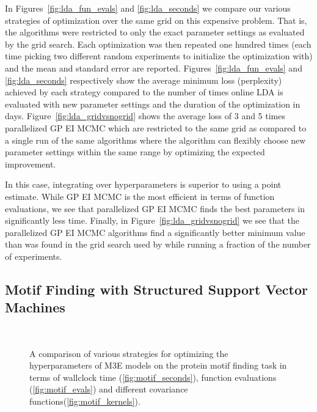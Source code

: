 \documentclass[aos,preprint]{imsart}
\begin{document}
In Figures~\ref{fig:lda_fun_evals} and \ref{fig:lda_seconds} we
compare our various strategies of optimization over the same grid on
this expensive problem. That is, the algorithms were restricted to
only the exact parameter settings as evaluated by the grid search.
Each optimization was then repeated one hundred times (each time
picking two different random experiments to initialize the
optimization with) and the mean and standard error are
reported. Figures~\ref{fig:lda_fun_evals} and \ref{fig:lda_seconds}
respectively show the average minimum loss (perplexity) achieved by
each strategy compared to the number of times online LDA is evaluated
with new parameter settings and the duration of the optimization in
days.  Figure~\ref{fig:lda_gridvsnogrid} shows the average loss of 3
and 5 times parallelized GP EI MCMC which are restricted to the same
grid as compared to a single run of the same algorithms where the
algorithm can flexibly choose new parameter settings within the same
range by optimizing the expected improvement.

In this case, integrating over hyperparameters is superior to using a point
estimate.  While GP EI MCMC is the most efficient in
terms of function evaluations, we see that parallelized GP EI MCMC
finds the best parameters in significantly less time.  Finally, in
Figure~\ref{fig:lda_gridvsnogrid} we see that the parallelized GP EI
MCMC algorithms find a significantly better minimum value than was
found in the grid search used by \citet{Hoffman2010} while running
a fraction of the number of experiments.

\subsection{Motif Finding with Structured Support Vector Machines}
\begin{figure}[ht]
\begin{center}
\\
\end{center}
\caption{A comparison of various strategies for optimizing the
  hyperparameters of M3E models on the protein motif finding task in
  terms of wallclock time (\ref{fig:motif_seconds}), function evaluations
  (\ref{fig:motif_evals}) and different covariance functions(\ref{fig:motif_kernels}).}
\end{figure}
\end{document}
